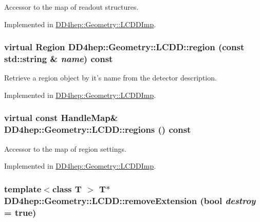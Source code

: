 Accessor to the map of readout structures. 

Implemented in \hyperlink{class_d_d4hep_1_1_geometry_1_1_l_c_d_d_imp_a0064b7e246b1e505e1b6d14483172325}{DD4hep::Geometry::LCDDImp}.\hypertarget{class_d_d4hep_1_1_geometry_1_1_l_c_d_d_adbe06759881707fe995472c03810c0ff}{
\subsubsection[{region}]{\setlength{\rightskip}{0pt plus 5cm}virtual {\bf Region} DD4hep::Geometry::LCDD::region (const std::string \& {\em name}) const}}
\label{class_d_d4hep_1_1_geometry_1_1_l_c_d_d_adbe06759881707fe995472c03810c0ff}


Retrieve a region object by it's name from the detector description. 

Implemented in \hyperlink{class_d_d4hep_1_1_geometry_1_1_l_c_d_d_imp_a4588edf168376c44fce31c62a92b48df}{DD4hep::Geometry::LCDDImp}.\hypertarget{class_d_d4hep_1_1_geometry_1_1_l_c_d_d_ab068e5aaa1d76a2348ea74ea3d76f96f}{
\subsubsection[{regions}]{\setlength{\rightskip}{0pt plus 5cm}virtual const {\bf HandleMap}\& DD4hep::Geometry::LCDD::regions () const}}
\label{class_d_d4hep_1_1_geometry_1_1_l_c_d_d_ab068e5aaa1d76a2348ea74ea3d76f96f}


Accessor to the map of region settings. 

Implemented in \hyperlink{class_d_d4hep_1_1_geometry_1_1_l_c_d_d_imp_a6037f7f69bd80cb6c73f8399a739645f}{DD4hep::Geometry::LCDDImp}.\hypertarget{class_d_d4hep_1_1_geometry_1_1_l_c_d_d_a9ddb061fc3a827afe0349e3a841ea885}{
\subsubsection[{removeExtension}]{\setlength{\rightskip}{0pt plus 5cm}template$<$class T $>$ {\bf T}$\ast$ DD4hep::Geometry::LCDD::removeExtension (bool {\em destroy} = {\ttfamily true})}}
\label{class_d_d4hep_1_1_geometry_1_1_l_c_d_d_a9ddb061fc3a827afe0349e3a841ea885}


